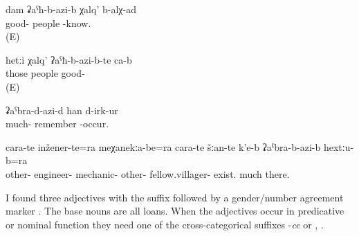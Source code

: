 \begin{exe}
	\ex
	\begin{xlist}
		\ex	\label{ex:I know good people}
		\gll	dam	ʡaˁħ-b-azi-b χalq'	b-alχ-ad \\
				good- people	-know.\\
		\glt	{} (E)

		\ex	\label{ex:Those people are good}
		\gll	hetːi χalq'	ʡaˁħ-b-azi-b-te	ca-b \\
			those	people	good-	 \\
		\glt	{} (E)

		\ex	\label{ex:I remember very much}
		\gll	ʡaˁbra-d-azi-d	han d-irk-ur \\
			much-	remember -occur. \\
		\glt	{}

		\ex	\label{ex:There are other engineers}
		\gll	cara-te	inžener-te=ra	meχanekːa-be=ra	cara-te	šːan-te	k'e-b	ʡaˁbra-b-azi-b	hextːu-b=ra \\
			other-	engineer-	mechanic-	other- 	fellow.villager-	exist.	much	there.  \\
		\glt	{}
	\end{xlist}
\end{exe}

I found three adjectives with the suffix  followed by a gender/number agreement marker . The base nouns are all loans. When the adjectives occur in predicative or nominal function they need one of the cross-categorical suffixes -\textit{ce} or  , .

